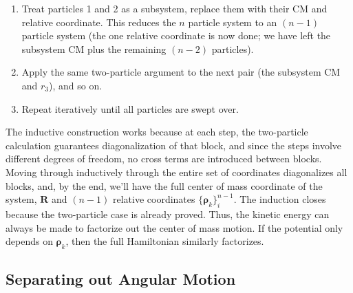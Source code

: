 \begin{enumerate}
    \item Treat particles 1 and 2 as a subsystem, replace them with their CM and relative coordinate. This reduces the $n$ particle system to an $(n-1)$ particle system (the one relative coordinate is now done; we have left the subsystem CM plus the remaining $(n-2)$ particles).
    \item Apply the same two-particle argument to the next pair (the subsystem CM and $r_3$), and so on.
    \item Repeat iteratively until all particles are swept over.
\end{enumerate}
The inductive construction works because at each step, the two-particle calculation guarantees diagonalization of that block, and since the steps involve different degrees of freedom, no cross terms are introduced between blocks. Moving through inductively through the entire set of coordinates diagonalizes all blocks, and, by the end, we'll have the full center of mass coordinate of the system, $\mathbf{R}$ and $(n-1)$ relative coordinates $\{\mathbf{\rho}_k\}_i^{n-1}$. The induction closes because the two-particle case is already proved. Thus, the kinetic energy can always be made to factorize out the center of mass motion. If the potential only depends on $\mathbf{\rho}_k$, then the full Hamiltonian similarly factorizes.


\subsection{Separating out Angular Motion}
